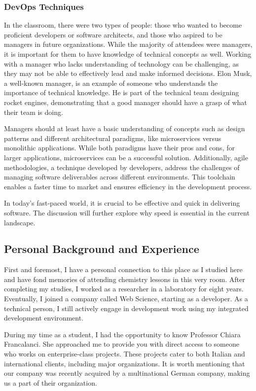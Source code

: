 \subsubsection{DevOps Techniques}

In the classroom, there were two types of people: those who wanted to
become proficient developers or software architects, and those who
aspired to be managers in future organizations. While the majority of
attendees were managers, it is important for them to have knowledge of
technical concepts as well. Working with a manager who lacks
understanding of technology can be challenging, as they may not be able
to effectively lead and make informed decisions. Elon Musk, a well-known
manager, is an example of someone who understands the importance of
technical knowledge. He is part of the technical team designing rocket
engines, demonstrating that a good manager should have a grasp of what
their team is doing.

Managers should at least have a basic understanding of concepts such as
design patterns and different architectural paradigms, like
microservices versus monolithic applications. While both paradigms have
their pros and cons, for larger applications, microservices can be a
successful solution. Additionally, agile methodologies, a technique
developed by developers, address the challenges of managing software
deliverables across different environments. This toolchain enables a
faster time to market and ensures efficiency in the development process.

In today's fast-paced world, it is crucial to be effective and quick in
delivering software. The discussion will further explore why speed is
essential in the current landscape.

\subsection{Personal Background and Experience}

First and foremost, I have a personal connection to this place as I
studied here and have fond memories of attending chemistry lessons in
this very room. After completing my studies, I worked as a researcher in
a laboratory for eight years. Eventually, I joined a company called Web
Science, starting as a developer. As a technical person, I still
actively engage in development work using my integrated development
environment.

During my time as a student, I had the opportunity to know Professor Chiara Francalanci.
She approached me to provide you with direct access to someone who works
on enterprise-class projects. These projects cater to both Italian and
international clients, including major organizations. It is worth
mentioning that our company was recently acquired by a multinational
German company, making us a part of their organization.


